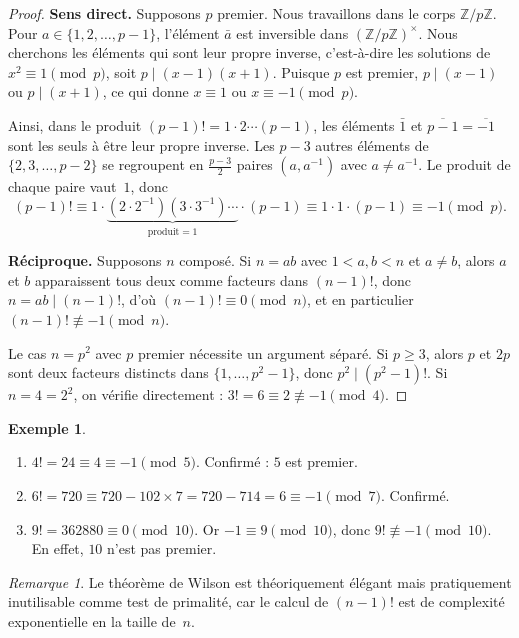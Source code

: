 \documentclass[12pt,a4paper,openany]{book}
\theoremstyle{definition}
\newtheorem{exemple}[definition]{Exemple}
\theoremstyle{plain}
\theoremstyle{remark}
\newtheorem{remarque}[definition]{Remarque}
\newcommand{\Z}{\mathbb{Z}}
\begin{document}
\begin{proof}
\textbf{Sens direct.} Supposons $p$ premier. Nous travaillons dans le corps
$\Z/p\Z$. Pour $a \in \{1, 2, \ldots, p-1\}$, l'élément $\bar{a}$ est inversible
dans $(\Z/p\Z)^\times$. Nous cherchons les éléments qui sont leur propre inverse,
c'est-à-dire les solutions de $x^2 \equiv 1 \pmod{p}$, soit $p \mid (x-1)(x+1)$.
Puisque $p$ est premier, $p \mid (x - 1)$ ou $p \mid (x + 1)$, ce qui donne
$x \equiv 1$ ou $x \equiv -1 \pmod{p}$.

Ainsi, dans le produit $(p-1)! = 1 \cdot 2 \cdots (p-1)$, les éléments $\bar{1}$
et $\overline{p-1} = \overline{-1}$ sont les seuls à être leur propre inverse. Les
$p - 3$ autres éléments de $\{2, 3, \ldots, p-2\}$ se regroupent en
$\frac{p-3}{2}$ paires $(a, a^{-1})$ avec $a \neq a^{-1}$. Le produit de chaque
paire vaut~$1$, donc
\[
  (p-1)! \equiv 1 \cdot \underbrace{(2 \cdot 2^{-1})(3 \cdot 3^{-1}) \cdots}_{\text{produit} = 1}
  \cdot (p-1) \equiv 1 \cdot 1 \cdot (p-1) \equiv -1 \pmod{p}.
\]

\textbf{Réciproque.} Supposons $n$ composé. Si $n = ab$ avec $1 < a, b < n$ et
$a \neq b$, alors $a$ et $b$ apparaissent tous deux comme facteurs dans $(n-1)!$,
donc $n = ab \mid (n-1)!$, d'où $(n-1)! \equiv 0 \pmod{n}$, et en particulier
$(n-1)! \not\equiv -1 \pmod{n}$.

Le cas $n = p^2$ avec $p$ premier nécessite un argument séparé. Si $p \geqslant 3$,
alors $p$ et $2p$ sont deux facteurs distincts dans $\{1, \ldots, p^2 - 1\}$,
donc $p^2 \mid (p^2 - 1)!$. Si $n = 4 = 2^2$, on vérifie directement :
$3! = 6 \equiv 2 \not\equiv -1 \pmod{4}$.
\end{proof}

\begin{exemple}
\label{ex:wilson}
\leavevmode
\begin{enumerate}[label=(\roman*)]
  \item $4! = 24 \equiv 4 \equiv -1 \pmod{5}$. Confirmé : $5$ est premier.
  \item $6! = 720 \equiv 720 - 102 \times 7 = 720 - 714 = 6 \equiv -1 \pmod{7}$.
    Confirmé.
  \item $9! = 362880 \equiv 0 \pmod{10}$. Or $-1 \equiv 9 \pmod{10}$, donc
    $9! \not\equiv -1 \pmod{10}$. En effet, $10$ n'est pas premier.
\end{enumerate}
\end{exemple}

\begin{remarque}
Le théorème de Wilson est théoriquement élégant mais pratiquement inutilisable
comme test de primalité, car le calcul de $(n-1)!$ est de complexité exponentielle
en la taille de~$n$.
\end{remarque}
\end{document}
